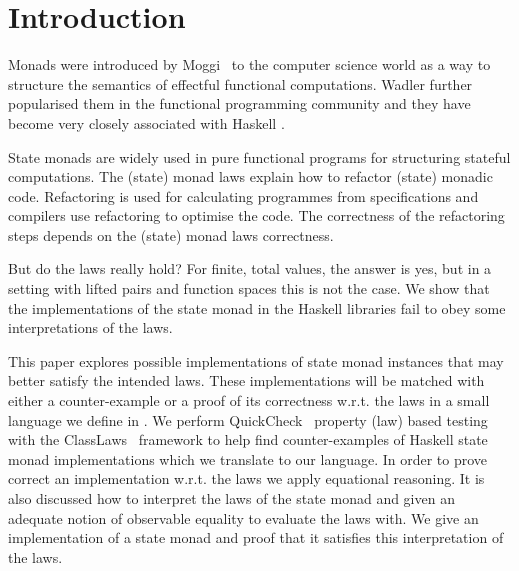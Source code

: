 
\section{Introduction}
\label{sec:intro}


Monads were introduced by Moggi~\cite{Moggi} to the computer science
world  as a way to structure the semantics of effectful functional
computations.
%
Wadler\cite{MFFP} further popularised them in the functional programming
community and they have become very closely associated with Haskell
\cite{haskell98}.


State monads are widely used in pure functional programs for
structuring stateful computations.
%
The (state) monad laws explain how to refactor (state) monadic code.
%
Refactoring is used for calculating programmes from specifications and
compilers  use refactoring to optimise the code.
%
The correctness of the refactoring steps depends on the (state) monad
laws correctness.


But do the laws really hold?
%
For finite, total values, the answer is yes, but in a setting with
lifted pairs and function spaces this is not the case.
%
We show that the implementations of the state monad in the Haskell
libraries fail to obey some interpretations of the laws.


This paper explores possible implementations of state monad instances
that may better satisfy the intended laws.
%
These implementations will be matched with either a counter-example or
a proof of its correctness w.r.t. the laws in a small language we
define in .
%
We perform QuickCheck~\cite{claessen-hughes-quickcheck} property (law)
based testing with the
ClassLaws~\cite{jeuring-jansson-amaral:2012:classlaws} framework to
help find counter-examples of Haskell state monad implementations
which we translate to our language.
%
In order to prove correct an implementation w.r.t. the laws we apply
equational reasoning.
%
It is also discussed how to interpret the laws of the state monad and
given an adequate notion of observable equality to evaluate the laws
with.
%
We give an implementation of a state monad and proof that it satisfies
this interpretation of the laws.

